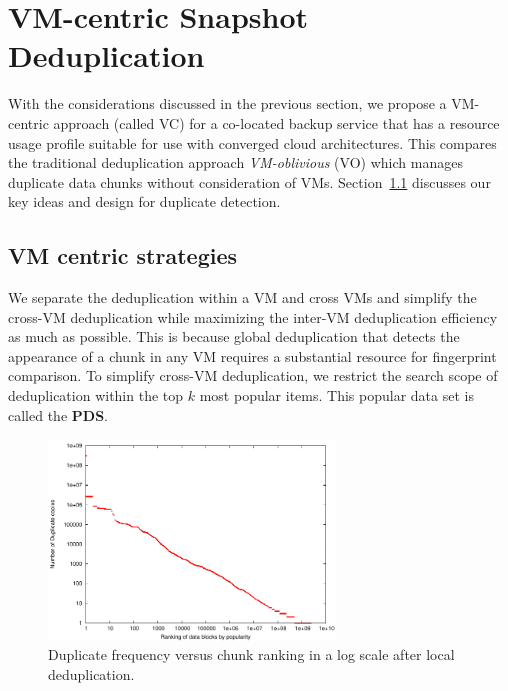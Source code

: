 \section{VM-centric Snapshot Deduplication}
\label{sect:deduplication}


With the considerations discussed in the previous section, we propose a
VM-centric approach (called VC)
for a co-located backup service that has a resource usage profile
suitable for use with converged cloud architectures.
This compares the traditional deduplication approach {\em VM-oblivious} (VO)
which manages duplicate data chunks without consideration of VMs.
Section~\ref{sect:vc-strategies} discusses  our key ideas and design for duplicate detection.

\subsection{VM centric  strategies}
\label{sect:vc-strategies}

We separate the deduplication within a VM and cross VMs
and simplify the cross-VM deduplication while maximizing the inter-VM deduplication efficiency  as much as possible.
This is because global deduplication that detects the appearance of a chunk 
in any VM requires a substantial resource for fingerprint comparison.
To simplify cross-VM deduplication, we restrict the search scope of deduplication within the top $k$ 
most popular items. This popular data set is called the \textbf{PDS}. 
 \begin{figure}
 \centering
  \includegraphics[width=3in]{figures/zipf_count_rank.pdf}
 \caption{Duplicate frequency versus  chunk ranking in a log scale after local deduplication.}
 \label{fig:Datazipf}
 \end{figure}


